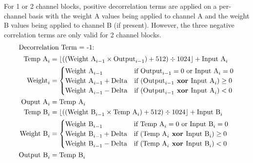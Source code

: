 \clearpage

For 1 or 2 channel blocks, positive decorrelation terms are applied
on a per-channel basis with the weight A values being applied
to channel A and the weight B values being applied to channel B
(if present).
However, the three negative correlation terms are only valid
for 2 channel blocks.
\begin{align*}
\intertext{Decorrelation Term = -1:}
\text{Temp A}_i &= \lfloor ((\text{Weight A}_{i - 1} \times \text{Output}_{i - 1}) + 512) \div 1024 \rfloor + \text{Input A}_i \\
\text{Weight}_i &=
\begin{cases}
\text{Weight A}_{i - 1} & \text{if } \text{Output}_{i - 1} = 0 \text{ or } \text{Input A}_i = 0 \\
\text{Weight A}_{i - 1} + \text{Delta} & \text{if } (\text{Output}_{i - 1} \textbf{ xor } \text{Input A}_i) \geq 0 \\
\text{Weight A}_{i - 1} - \text{Delta} & \text{if } (\text{Output}_{i - 1} \textbf{ xor } \text{Input A}_i) < 0
\end{cases} \\
\text{Ouput A}_i &= \text{Temp A}_i \\
\text{Temp B}_i &= \lfloor ((\text{Weight B}_{i - 1} \times \text{Temp A}_i) + 512) \div 1024 \rfloor + \text{Input B}_i \\
\text{Weight B}_i &=
\begin{cases}
\text{Weight B}_{i - 1} & \text{if } \text{Temp A}_i = 0 \text{ or } \text{Input B}_i = 0 \\
\text{Weight B}_{i - 1} + \text{Delta} & \text{if } (\text{Temp A}_i \textbf{ xor } \text{Input B}_i) \geq 0 \\
\text{Weight B}_{i - 1} - \text{Delta} & \text{if } (\text{Temp A}_i \textbf{ xor } \text{Input B}_i) < 0
\end{cases} \\
\text{Output B}_i &= \text{Temp B}_i
\end{align*}
